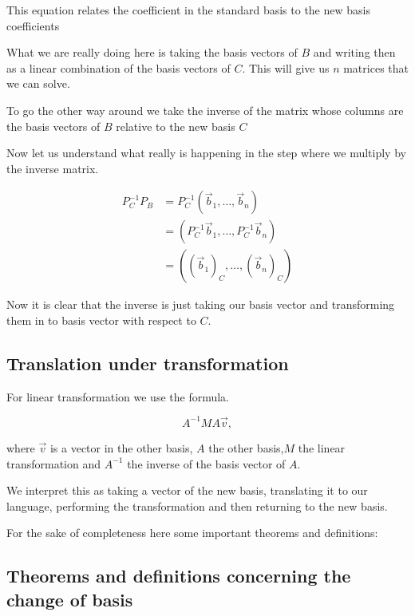 This equation relates the coefficient in the standard basis to the new basis
coefficients
\vspace{\baselineskip}

What we are really doing here is taking the basis vectors of \(B\) and writing then as a linear combination
of the basis vectors of \(C\). This will give us \(n\) matrices that we can solve.
\vspace{\baselineskip}

To go the other way around we take the inverse of the matrix whose columns are the basis vectors of \(B\)
relative to the new basis \(C\)
\vspace{\baselineskip}

Now let us understand what really is happening in the step where we multiply by the inverse matrix.

\begin{align*}
P_{C}^{-1} P_B &= P_{C}^{-1}(\vec{b}_1, \dots, \vec{b}_n) \\
&= (P_{C}^{-1}\vec{b}_1, \dots, P_{C}^{-1}\vec{b}_n)\\
&= ({(\vec{b}_1)}_C, \dots, {(\vec{b}_n)}_C)
\end{align*}

Now it is clear that the inverse is just taking our basis vector and transforming
them in to basis vector with respect to \(C\).

\subsection{Translation under transformation}

For linear transformation we use the formula.

\[A^{-1} M A \vec{v},\]

where \(\vec{v}\) is a vector in the other basis, \(A\) the
other basis,\(M\) the linear transformation and \(A^{-1}\) the inverse of
the basis vector of \(A\).
\vspace{\baselineskip}

We interpret this as taking a vector of the new basis, translating it to our language,
performing the transformation and then returning to the new basis.
\vspace{\baselineskip}

For the sake of completeness here some important theorems and definitions:

\subsection{Theorems and definitions concerning the change of basis}

